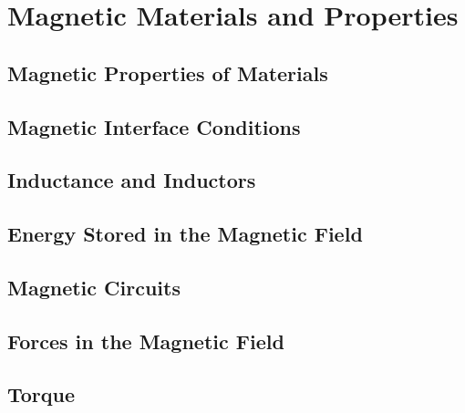 \section{Magnetic Materials and Properties}

\subsection{Magnetic Properties of Materials}

\subsection{Magnetic Interface Conditions}

\subsection{Inductance and Inductors}

\subsection{Energy Stored in the Magnetic Field}

\subsection{Magnetic Circuits}

\subsection{Forces in the Magnetic Field}

\subsection{Torque}
